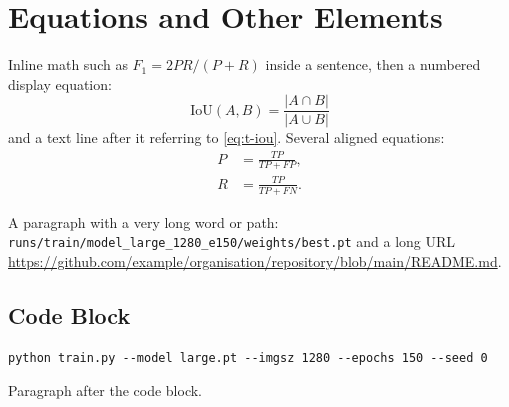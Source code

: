 \section{Equations and Other Elements}

Inline math such as $F_1 = 2PR/(P+R)$ inside a sentence, then a numbered
display equation:
\begin{equation}
  \text{IoU}(A,B) = \frac{|A \cap B|}{|A \cup B|}
  \label{eq:t-iou}
\end{equation}
and a text line after it referring to \cref{eq:t-iou}. Several aligned
equations:
\begin{align}
  P &= \frac{TP}{TP+FP}, \\
  R &= \frac{TP}{TP+FN}.
\end{align}

A paragraph with a very long word or path:
\texttt{runs/train/model\_large\_1280\_e150/weights/best.pt} and a long URL
\url{https://github.com/example/organisation/repository/blob/main/README.md}.

\subsection{Code Block}

\begin{verbatim}
python train.py --model large.pt --imgsz 1280 --epochs 150 --seed 0
\end{verbatim}

Paragraph after the code block.

